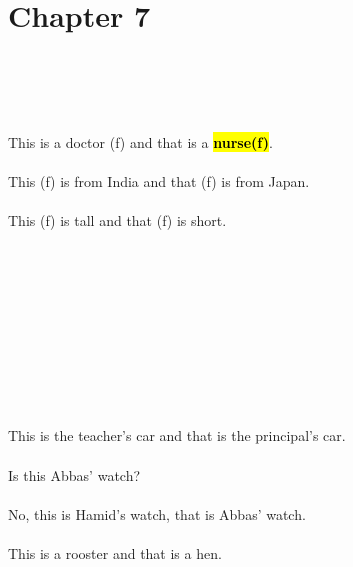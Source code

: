 \section{Chapter 7}
\doublespace
\noindent
{}\\[0.1in]
\\[0.1in]
\\[0.1in]
\\[0.1in]
This is a doctor (f) and that is a \hl{\textbf{nurse(f)}}. \\[0.1in] \answerline \\[0.1in]
This (f) is from India and that (f) is from Japan.\\[0.1in] \answerline \\[0.1in]
This (f) is tall and that (f) is short. \\[0.1in] \answerline \\[0.1in]\\ 
\\[0.1in]
\\[0.1in]
\\[0.1in]
\\[1in]
\\[0.1in]
\\[0.1in]

\noindent
{}\\[0.1in]
\\[1in]
This is the teacher's car and that is the principal's car. \\[0.1in] \answerline \\[1in]
Is this Abbas' watch?\\[0.1in] \answerline \\
No, this is Hamid's watch, that is Abbas' watch.\\[0.1in] \answerline \\[0.3in]
This is a rooster and that is a hen.\\[0.1in] \answerline \\[0.3in]

